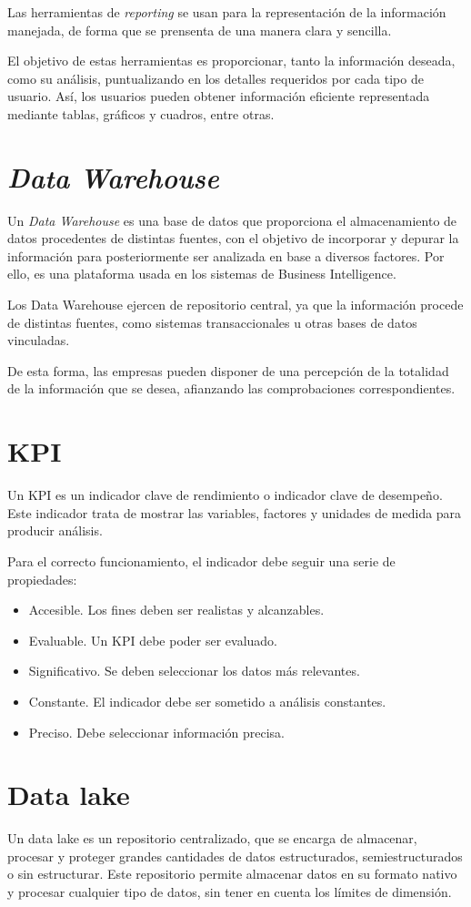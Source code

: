 Las herramientas de \emph{reporting} se usan para la representación de la información manejada, de forma que se prensenta de una manera clara y sencilla. 

El objetivo de estas herramientas es proporcionar, tanto la información deseada, como su análisis, puntualizando en los detalles requeridos por cada tipo de usuario. Así, los usuarios pueden obtener información eficiente representada mediante tablas, gráficos y cuadros, entre otras.

\section{\emph{Data Warehouse}}
Un \emph{Data Warehouse} \cite{Data_Warehouse} es una base de datos que proporciona el almacenamiento de datos procedentes de distintas fuentes, con el objetivo de incorporar y depurar la información para posteriormente ser analizada en base a diversos factores. Por ello, es una plataforma usada en los sistemas de Business Intelligence.

Los Data Warehouse ejercen de repositorio central, ya que la información procede de distintas fuentes, como sistemas transaccionales u otras bases de datos vinculadas. 

De esta forma, las empresas pueden disponer de una percepción de la totalidad de la información que se desea, afianzando las comprobaciones correspondientes.
\newpage
\section{KPI}
Un KPI \cite{KPI} es un indicador clave de rendimiento o indicador clave de desempeño. Este indicador trata de mostrar las variables, factores y unidades de medida para producir análisis.

Para el correcto funcionamiento, el indicador debe seguir una serie de propiedades:
\begin{itemize}
	\item Accesible. Los fines deben ser realistas y alcanzables. 
	\item Evaluable. Un KPI debe poder ser evaluado.
	\item Significativo. Se deben seleccionar los datos más relevantes.
	\item Constante. El indicador debe ser sometido a análisis constantes. 
	\item Preciso. Debe seleccionar información precisa.
\end{itemize}
\section{Data lake} 
Un data lake \cite{data_lake} es un repositorio centralizado, que se encarga de almacenar, procesar y proteger grandes cantidades de datos estructurados, semiestructurados o sin estructurar. Este repositorio permite almacenar datos en su formato nativo y procesar cualquier tipo de datos, sin tener en cuenta los límites de dimensión.

